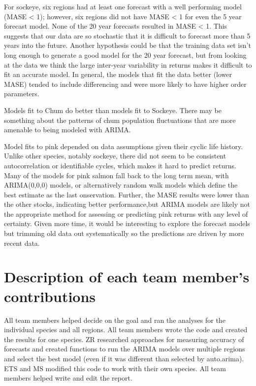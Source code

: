 \documentclass[
]{article}
\begin{document}
For sockeye, six regions had at least one forecast with a well
performing model (MASE \textless{} 1); however, six regions did not have
MASE \textless{} 1 for even the 5 year forecast model. None of the 20
year forecasts resulted in MASE \textless{} 1. This suggests that our
data are so stochastic that it is difficult to forecast more than 5
years into the future. Another hypothesis could be that the training
data set isn't long enough to generate a good model for the 20 year
forecast, but from looking at the data we think the large inter-year
variability in returns makes it difficult to fit an accurate model. In
general, the models that fit the data better (lower MASE) tended to
include differencing and were more likely to have higher order
parameters.

Models fit to Chum do better than models fit to Sockeye. There may be
something about the patterns of chum population fluctuations that are
more amenable to being modeled with ARIMA.

Model fits to pink depended on data assumptions given their cyclic life
history. Unlike other species, notably sockeye, there did not seem to be
consistent autocorrelation or identifiable cycles, which makes it hard
to predict returns. Many of the models for pink salmon fall back to the
long term mean, with ARIMA(0,0,0) models, or alternatively random walk
models which define the best estimate as the last onservation. Further,
the MASE results were lower than the other stocks, indicating better
performance,but ARIMA models are likely not the appropriate method for
assessing or predicting pink returns with any level of certainty. Given
more time, it would be interesting to explore the forecast models but
trimming old data out systematically so the predictions are driven by
more recent data.

\hypertarget{description-of-each-team-members-contributions}{%
\section{Description of each team member's
contributions}\label{description-of-each-team-members-contributions}}

All team members helped decide on the goal and ran the analyses for the
individual species and all regions. All team members wrote the code and
created the results for one species. ZR researched approaches for
measuring accuracy of forecasts and created functions to run the ARIMA
models over multiple regions and select the best model (even if it was
different than selected by auto.arima). ETS and MS modified this code to
work with their own species. All team members helped write and edit the
report.
\end{document}
